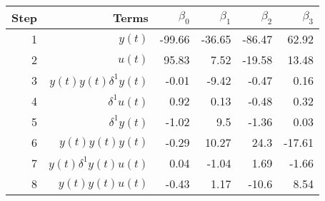 \begin{tabular}{rrrrrr}
Step & Terms & $\beta_{0}$ & $\beta_{1}$ & $\beta_{2}$ & $\beta_{3}$ \\ 
\hline 
1 & $y(t)$ & -99.66 & -36.65 & -86.47 & 62.92 \\ 
2 & $u(t)$ & 95.83 & 7.52 & -19.58 & 13.48 \\ 
3 & $y(t)y(t)\delta^1 y(t)$ & -0.01 & -9.42 & -0.47 & 0.16 \\ 
4 & $\delta^1 u(t)$ & 0.92 & 0.13 & -0.48 & 0.32 \\ 
5 & $\delta^1 y(t)$ & -1.02 & 9.5 & -1.36 & 0.03 \\ 
6 & $y(t)y(t)y(t)$ & -0.29 & 10.27 & 24.3 & -17.61 \\ 
7 & $y(t)\delta^1 y(t)u(t)$ & 0.04 & -1.04 & 1.69 & -1.66 \\ 
8 & $y(t)y(t)u(t)$ & -0.43 & 1.17 & -10.6 & 8.54 \\ 
\hline 
\end{tabular}